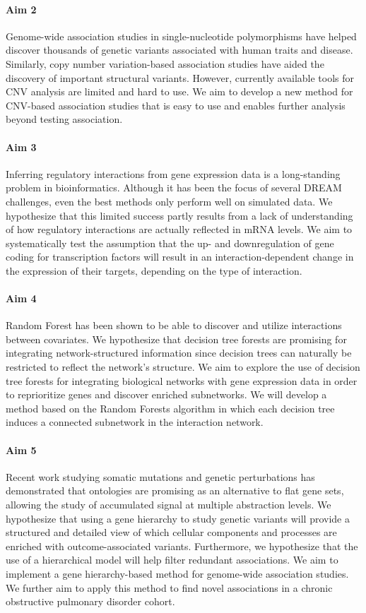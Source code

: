 \paragraph{Aim 2}
Genome-wide association studies in single-nucleotide polymorphisms have helped discover thousands of genetic variants associated with human traits and disease. Similarly, copy number variation-based association studies have aided the discovery of important structural variants. However, currently available tools for CNV analysis are limited and hard to use. We aim to develop a new method for CNV-based association studies that is easy to use and enables further analysis beyond testing association.

\paragraph{Aim 3}
Inferring regulatory interactions from gene expression data is a long-standing problem in bioinformatics. Although it has been the focus of several DREAM challenges, even the best methods only perform well on simulated data. We hypothesize that this limited success partly results from a lack of understanding of how regulatory interactions are actually reflected in mRNA levels. We aim to systematically test the assumption that the up- and downregulation of gene coding for transcription factors will result in an interaction-dependent change in the expression of their targets, depending on the type of interaction.

\paragraph{Aim 4}
Random Forest has been shown to be able to discover and utilize interactions between covariates. We hypothesize that decision tree forests are promising for integrating network-structured information since decision trees can naturally be restricted to reflect the network's structure. We aim to explore the use of decision tree forests for integrating biological networks with gene expression data in order to reprioritize genes and discover enriched subnetworks. We will develop a method based on the Random Forests algorithm in which each decision tree induces a connected subnetwork in the interaction network.

\paragraph{Aim 5}
Recent work studying somatic mutations and genetic perturbations has demonstrated that ontologies are promising as an alternative to flat gene sets, allowing the study of accumulated signal at multiple abstraction levels. We hypothesize that using a gene hierarchy to study genetic variants will provide a structured and detailed view of which cellular components and processes are enriched with outcome-associated variants. Furthermore, we hypothesize that the use of a hierarchical model will help filter redundant associations. We aim to implement a gene hierarchy-based method for genome-wide association studies. We further aim to apply this method to find novel associations in a chronic obstructive pulmonary disorder cohort.
